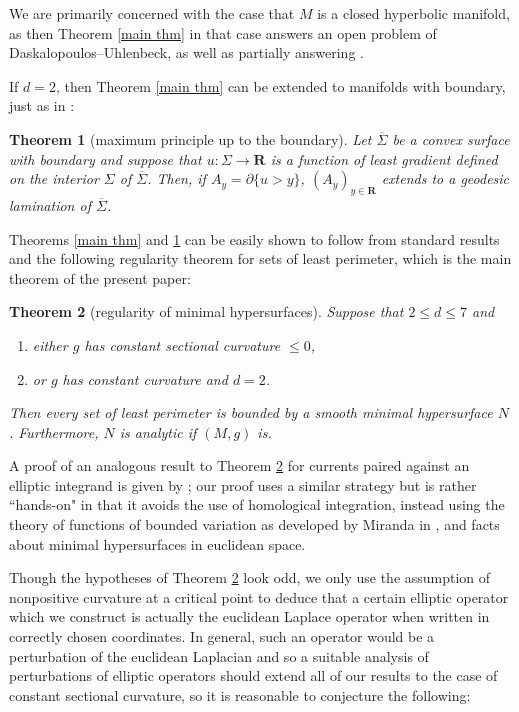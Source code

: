 \documentclass[reqno,12pt,letterpaper]{amsart}
\newcommand{\RR}{\mathbf{R}}
\newtheorem{theorem}{Theorem}[section]
\theoremstyle{definition}
\numberwithin{equation}{section}
\begin{document}
We are primarily concerned with the case that $M$ is a closed hyperbolic manifold, as then Theorem \ref{main thm} in that case answers an open problem \cite[Problem 9.4]{daskalopoulos2020transverse} of Daskalopoulos--Uhlenbeck, as well as partially answering \cite[Problem 9.13]{daskalopoulos2020transverse}.

If $d = 2$, then Theorem \ref{main thm} can be extended to manifolds with boundary, just as in \cite[Corollary 3.5]{górny2017planar}:

\begin{theorem}[maximum principle up to the boundary]\label{main crly}
Let $\overline \Sigma$ be a convex surface with boundary and suppose that $u: \Sigma \to \RR$ is a function of least gradient defined on the interior $\Sigma$ of $\overline \Sigma$.
Then, if $A_y = \partial \{u > y\}$, $(A_y)_{y \in \RR}$ extends to a geodesic lamination of $\overline \Sigma$.
\end{theorem}

Theorems \ref{main thm} and \ref{main crly} can be easily shown to follow from standard results and the following regularity theorem for sets of least perimeter, which is the main theorem of the present paper:

\begin{theorem}[regularity of minimal hypersurfaces]\label{main lma}
Suppose that $2 \leq d \leq 7$ and
\begin{enumerate}
\item either $g$ has constant sectional curvature $\leq 0$,
\item or $g$ has constant curvature and $d = 2$.
\end{enumerate}
Then every set of least perimeter is bounded by a smooth minimal hypersurface $N$.
Furthermore, $N$ is analytic if $(M, g)$ is.
\end{theorem}

A proof of an analogous result to Theorem \ref{main lma} for currents paired against an elliptic integrand is given by \cite[\S5.3]{federer2014geometric}; our proof uses a similar strategy but is rather ``hands-on" in that it avoids the use of homological integration, instead using the theory of functions of bounded variation as developed by Miranda in \cite{Miranda64} \cite{Miranda66} \cite{Miranda67}, and facts about minimal hypersurfaces in euclidean space.

Though the hypotheses of Theorem \ref{main lma} look odd, we only use the assumption of nonpositive curvature at a critical point to deduce that a certain elliptic operator which we construct is actually the euclidean Laplace operator when written in correctly chosen coordinates.
In general, such an operator would be a perturbation of the euclidean Laplacian and so a suitable analysis of perturbations of elliptic operators should extend all of our results to the case of constant sectional curvature, so it is reasonable to conjecture the following:
\end{document}
